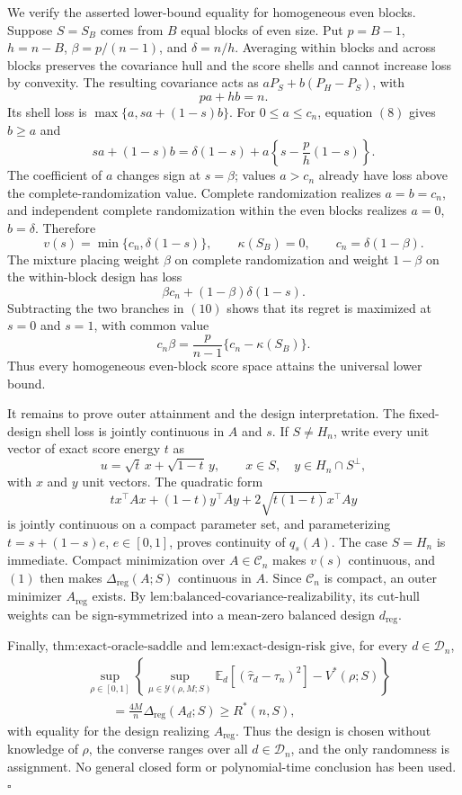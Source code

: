 We verify the asserted lower-bound equality for homogeneous even blocks.  Suppose \(S=S_B\) comes from \(B\) equal blocks of even size.  Put \(p=B-1\), \(h=n-B\), \(\beta=p/(n-1)\), and \(\delta=n/h\).  Averaging within blocks and across blocks preserves the covariance hull and the score shells and cannot increase loss by convexity.  The resulting covariance acts as \(aP_S+b(P_H-P_S)\), with
\[
pa+hb=n.
\tag{8}
\]
Its shell loss is \(\max\{a,sa+(1-s)b\}\).  For \(0\leq a\leq c_n\), equation \((8)\) gives \(b\geq a\) and
\[
sa+(1-s)b
=\delta(1-s)+a\left\{s-\frac{p}{h}(1-s)\right\}.
\tag{9}
\]
The coefficient of \(a\) changes sign at \(s=\beta\); values \(a>c_n\) already have loss above the complete-randomization value.  Complete randomization realizes \(a=b=c_n\), and independent complete randomization within the even blocks realizes \(a=0\), \(b=\delta\).  Therefore
\[
v(s)=\min\{c_n,\delta(1-s)\},
\qquad
\kappa(S_B)=0,
\qquad
c_n=\delta(1-\beta).
\tag{10}
\]
The mixture placing weight \(\beta\) on complete randomization and weight \(1-\beta\) on the within-block design has loss
\[
\beta c_n+(1-\beta)\delta(1-s).
\]
Subtracting the two branches in \((10)\) shows that its regret is maximized at \(s=0\) and \(s=1\), with common value
\[
c_n\beta=\frac{p}{n-1}\{c_n-\kappa(S_B)\}.
\tag{11}
\]
Thus every homogeneous even-block score space attains the universal lower bound.

It remains to prove outer attainment and the design interpretation.  The fixed-design shell loss is jointly continuous in \(A\) and \(s\).  If \(S\neq H_n\), write every unit vector of exact score energy \(t\) as
\[
u=\sqrt t\,x+\sqrt{1-t}\,y,
\qquad x\in S,\quad y\in H_n\cap S^\perp,
\]
with \(x\) and \(y\) unit vectors.  The quadratic form
\[
t x^\top Ax+(1-t)y^\top Ay
+2\sqrt{t(1-t)}x^\top Ay
\]
is jointly continuous on a compact parameter set, and parameterizing \(t=s+(1-s)e\), \(e\in[0,1]\), proves continuity of \(q_s(A)\).  The case \(S=H_n\) is immediate.  Compact minimization over \(A\in\mathcal C_n\) makes \(v(s)\) continuous, and \((1)\) then makes \(\Delta_{\mathrm{reg}}(A;S)\) continuous in \(A\).  Since \(\mathcal C_n\) is compact, an outer minimizer \(A_{\mathrm{reg}}\) exists.  By \(\text{lem:balanced-covariance-realizability}\), its cut-hull weights can be sign-symmetrized into a mean-zero balanced design \(d_{\mathrm{reg}}\).

Finally, \(\text{thm:exact-oracle-saddle}\) and \(\text{lem:exact-design-risk}\) give, for every \(d\in\mathcal D_n\),
\[
\begin{aligned}
&\sup_{\rho\in[0,1]}
\left\{
\sup_{\mu\in\mathcal Y(\rho,M;S)}
\mathbb E_d[(\widehat\tau_d-\tau_n)^2]-V^*(\rho;S)
\right\}\\
&\qquad=\frac{4M}{n}\Delta_{\mathrm{reg}}(A_d;S)
\geq R^*(n,S),
\end{aligned}
\tag{12}
\]
with equality for the design realizing \(A_{\mathrm{reg}}\).  Thus the design is chosen without knowledge of \(\rho\), the converse ranges over all \(d\in\mathcal D_n\), and the only randomness is assignment.  No general closed form or polynomial-time conclusion has been used. \(\square\)